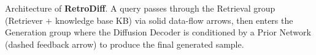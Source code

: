 \caption{Architecture of \textbf{RetroDiff}. A query passes through the Retrieval group (Retriever + knowledge base KB) via solid data-flow arrows, then enters the Generation group where the Diffusion Decoder is conditioned by a Prior Network (dashed feedback arrow) to produce the final generated sample.}
